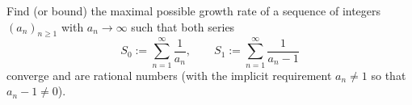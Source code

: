 Find (or bound) the maximal possible growth rate of a sequence of integers $(a_n)_{n\ge 1}$ with $a_n\to\infty$ such that both series
\[
S_0:=\sum_{n=1}^{\infty}\frac{1}{a_n},
\qquad
S_1:=\sum_{n=1}^{\infty}\frac{1}{a_n-1}
\]
converge and are rational numbers (with the implicit requirement $a_n\neq 1$ so that $a_n-1\neq 0$).
